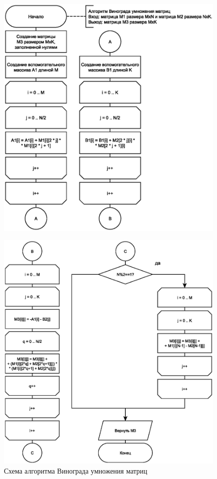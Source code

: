 \clearpage

\begin{figure}[h]
	\centering
	\includegraphics[scale=1]{img/vinograd-1.eps}
	\label{fig:vinograd-1}
\end{figure}
\begin{figure}[h]
	\centering
    \includegraphics[scale=0.9]{img/vinograd-2.eps}
	\caption{Схема алгоритма Винограда умножения матриц}
	\label{fig:vinograd}
\end{figure}

